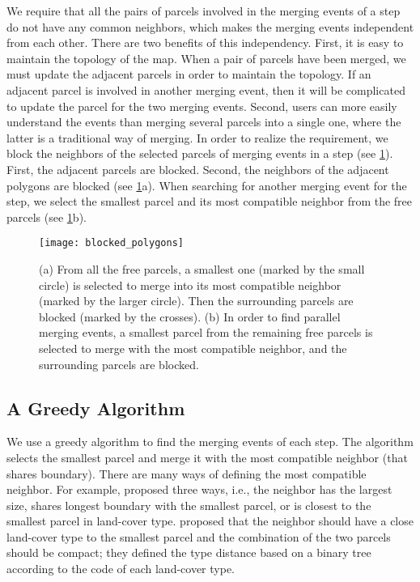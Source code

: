\documentclass[ijgi,article,submit,moreauthors,pdftex]{Definitions/mdpi}
\begin{document}
We require that 
all the pairs of parcels involved in the merging events of a step 
do not have any common neighbors, 
which makes the merging events independent from each other.
There are two benefits of this independency.
First, it is easy to maintain the topology of the map.
When a pair of parcels have been merged, 
we must update the adjacent parcels in order to maintain the topology.
If an adjacent parcel is involved in another merging event,
then it will be complicated to update the parcel for the two merging events.
Second, users can more easily understand the events 
than merging several parcels into a single one,
where the latter is a traditional way of merging.
In order to realize the requirement, 
we block the neighbors of the selected parcels of merging events in a step
(see \fig\ref{fig:blocked_polygons}).
First, the adjacent parcels are blocked.
Second, the neighbors
of the adjacent polygons are blocked (see \fig\ref{fig:blocked_polygons}a).
When searching for another merging event for the step, 
we select the smallest parcel and its most compatible neighbor
from the free parcels (see \fig\ref{fig:blocked_polygons}b).

\begin{figure}[tb]
\centering
\texttt{[image: blocked\_polygons]}
\caption{(a) From all the free parcels,
a smallest one (marked by the small circle) is selected to merge into
its most compatible neighbor (marked by the larger circle).
Then the surrounding parcels are blocked (marked by the crosses).
(b) In order to find parallel merging events, 
a smallest parcel from the remaining free parcels
is selected to merge with the most compatible neighbor,
and the surrounding parcels are blocked.
}
\label{fig:blocked_polygons}
\end{figure}



\subsection{A Greedy Algorithm}
\label{sec:greedy_algo}


We use a greedy algorithm to find the merging events of each step.
The algorithm selects the smallest parcel and merge it with
the most compatible neighbor (that shares boundary).
There are many ways of defining the most compatible neighbor.
For example, \citet{Cheng2006} proposed three ways, i.e.,
the neighbor has the largest size, 
shares longest boundary with the smallest parcel,
or is closest to the smallest parcel in land-cover type. 
\citet{Peng2017AStar} proposed that 
the neighbor should have a close land-cover type
to the smallest parcel
and the combination of the two parcels should be compact;
they defined the type distance based on a binary tree
according to the code of each land-cover type.
\end{document}
